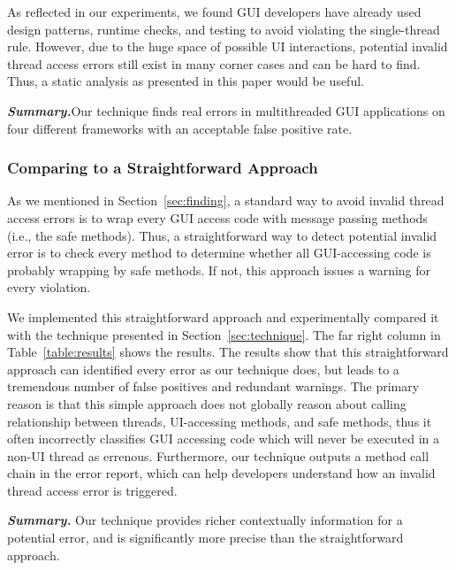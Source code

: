As reflected in our experiments, we found GUI developers have already
used design patterns, runtime checks, and testing to avoid violating
the single-thread rule. However, due to the huge space of
possible UI interactions, potential
invalid thread access errors still exist in many corner cases and
can be hard to find. Thus, a static analysis as presented in this paper
would be useful.

\vspace{1mm}

\noindent \textbf{\textit{Summary.}}Our technique finds real errors
in multithreaded GUI applications on four different frameworks with
an acceptable false positive rate.

\subsubsection{Comparing to a Straightforward Approach}
\label{sec:straightforward}

As we mentioned in Section~\ref{sec:finding}, a standard way to avoid
invalid thread access errors is to wrap every GUI access code
with message passing methods (i.e., the safe methods). Thus, a
straightforward way to detect potential invalid error
is to check every method to determine whether all GUI-accessing code
is probably wrapping by safe methods. If not, this approach
issues a warning for every violation. 

We implemented this straightforward approach and experimentally compared it
with the technique presented in Section~\ref{sec:technique}.
The far right column in Table~\ref{table:results} shows the results.
The results show that this straightforward approach can identified every
error as our technique does, but leads to a tremendous number of false
positives and redundant warnings. The primary reason is that this simple approach
does not globally reason about calling relationship between
threads, UI-accessing methods, and safe methods, thus it often incorrectly
classifies GUI accessing code which will never be executed
in a non-UI thread as errenous. Furthermore, our technique
outputs a method call chain in the error report, which can help
developers understand how an invalid thread access error is triggered.



\vspace{1mm}

\noindent \textbf{\textit{Summary.}} Our technique provides
richer contextually information for a potential error, and 
is significantly more precise than the straightforward approach.

